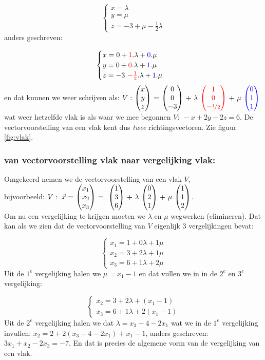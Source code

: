 \documentclass[hidelinks, a4wide, 12pt,  twoside]{book}
\begin{document}
\[\begin{cases}
x =  \lambda\\
y =  \mu\\
z = -3 + \mu -   \frac{1}{2} \lambda 
\end{cases}
\] 
anders geschreven:

\[\begin{cases}
x =  0 + {\color{red}1}.\lambda +  {\color{blue}0}.\mu\\
y =  0 +  {\color{red}0}.\lambda  + {\color{blue}1}. \mu\\
z = -3 \  {\color{red}- \frac{1}{2}} .\lambda + {\color{blue}1}.\mu 
\end{cases}
\] 
en dat kunnen we weer schrijven als:
$ V: \ \vecdrie{x}{y}{z} \ = \ \vecdrie{0}{0}{-3} \ + \ \lambda \  \vecdrie[red]{1}{0}{-\nicefrac{1} {2}}   \ + \ \mu \ \vecdrie[blue]{0}{1}{1} $ wat weer hetzelfde vlak is als waar we mee begonnen $ V: \ -x + 2y -2z = 6 $.
De vectorvoorstelling van een vlak kent dus \textit{twee}  richtingsvectoren. 
Zie  figuur  \ref{fig:vlak}.

\subsubsection{van vectorvoorstelling vlak naar vergelijking vlak:}
Omgekeerd nemen we de vectorvoorstelling van een vlak $ V $,\\ 
bijvoorbeeld:
$ V: \  \vec{x} =\  \vecdriesnel{x} \ = \  \ \vecdrie{1}{3}{6} \ + \ \lambda \ \vecdrie{0}{2}{1} \ + \ \mu \ \vecdrie{1}{1}{2} $.\\
Om nu een vergelijking te krijgen moeten we $ \lambda $  en $ \mu $ wegwerken (elimineren). Dat kan als we zien dat de vectorvoorstelling van $ V $ eigenlijk 3 vergelijkingen bevat:

\[\begin{cases}
x_1 =  1 + 0\lambda + 1\mu\\
x_2 =  3 + 2\lambda  + 1\mu\\
x_3 = 6 + 1 \lambda + 2\mu  
\end{cases}
\] 
Uit de $ 1^{e}$ vergelijking halen we $ \mu = x_1 -1 $ en dat vullen we in in de $ 2^{e}$ en $ 3^{e}$ vergelijking:

\[\begin{cases}
x_2 =  3 + 2\lambda  + ( x_1 -1)\\
x_3 = 6 + 1 \lambda + 2( x_1 -1)
\end{cases}
\] 
Uit de $ 2^{e}$ vergelijking halen we dat $ \lambda = x_3 - 4 - 2x_1 $ wat we in de $ 1^{e}$ vergelijking invullen:
$ x_2 = 2 + 2(x_3 -4 -2x_1) + x_1 - 1$, anders geschreven: $ 3x_1 +x_2 - 2x_3 = -7
$. En dat is precies de algemene vorm van de vergelijking van een vlak.
\end{document}
